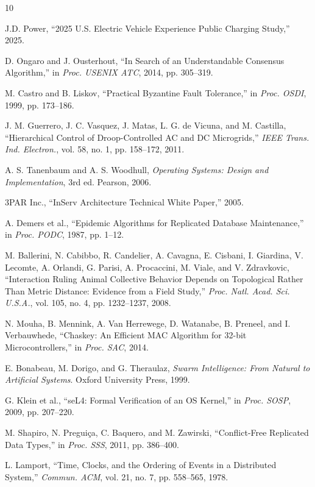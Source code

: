 \documentclass[conference,10pt]{IEEEtran}
\begin{document}

\begin{thebibliography}{10}

J.D. Power, ``2025 U.S. Electric Vehicle Experience Public Charging Study,'' 2025.

D. Ongaro and J. Ousterhout, ``In Search of an Understandable Consensus Algorithm,'' in \textit{Proc. USENIX ATC}, 2014, pp. 305--319.

M. Castro and B. Liskov, ``Practical Byzantine Fault Tolerance,'' in \textit{Proc. OSDI}, 1999, pp. 173--186.

J. M. Guerrero, J. C. Vasquez, J. Matas, L. G. de Vicuna, and M. Castilla, ``Hierarchical Control of Droop-Controlled AC and DC Microgrids,'' \textit{IEEE Trans. Ind. Electron.}, vol. 58, no. 1, pp. 158--172, 2011.

A. S. Tanenbaum and A. S. Woodhull, \textit{Operating Systems: Design and Implementation}, 3rd ed. Pearson, 2006.

3PAR Inc., ``InServ Architecture Technical White Paper,'' 2005.

A. Demers et al., ``Epidemic Algorithms for Replicated Database Maintenance,'' in \textit{Proc. PODC}, 1987, pp. 1--12.

M. Ballerini, N. Cabibbo, R. Candelier, A. Cavagna, E. Cisbani, I. Giardina, V. Lecomte, A. Orlandi, G. Parisi, A. Procaccini, M. Viale, and V. Zdravkovic, ``Interaction Ruling Animal Collective Behavior Depends on Topological Rather Than Metric Distance: Evidence from a Field Study,'' \textit{Proc. Natl. Acad. Sci. U.S.A.}, vol. 105, no. 4, pp. 1232--1237, 2008.

N. Mouha, B. Mennink, A. Van Herrewege, D. Watanabe, B. Preneel, and I. Verbauwhede, ``Chaskey: An Efficient MAC Algorithm for 32-bit Microcontrollers,'' in \textit{Proc. SAC}, 2014.

E. Bonabeau, M. Dorigo, and G. Theraulaz, \textit{Swarm Intelligence: From Natural to Artificial Systems}. Oxford University Press, 1999.

G. Klein et al., ``seL4: Formal Verification of an OS Kernel,'' in \textit{Proc. SOSP}, 2009, pp. 207--220.

M. Shapiro, N. Pregui\c{c}a, C. Baquero, and M. Zawirski, ``Conflict-Free Replicated Data Types,'' in \textit{Proc. SSS}, 2011, pp. 386--400.

L. Lamport, ``Time, Clocks, and the Ordering of Events in a Distributed System,'' \textit{Commun. ACM}, vol. 21, no. 7, pp. 558--565, 1978.

\end{thebibliography}
\end{document}
